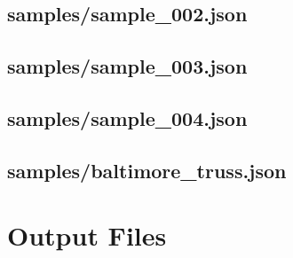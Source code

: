 \documentclass{article}
\begin{document}
\begin{appendices}
\subsection{samples/sample\_002.json}\label{app:samples/sample_002.json}


\subsection{samples/sample\_003.json}\label{app:samples/sample_003.json}


\subsection{samples/sample\_004.json}\label{app:samples/sample_004.json}


\subsection{samples/baltimore\_truss.json}\label{app:samples/baltimore_truss.json}



\section{Output Files}


\end{appendices}
\end{document}

